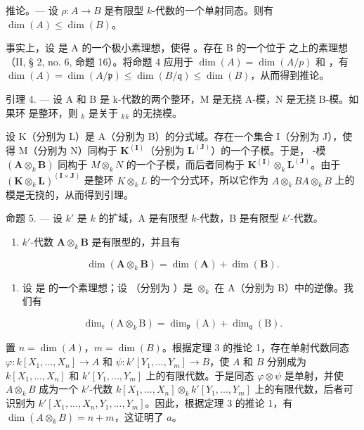 推论。--- 设 \(\rho: A \to B\) 是有限型 \(k\)-代数的一个单射同态。则有 \(\dim(A) \leqslant \dim(B)\)。

事实上，设  是 A 的一个极小素理想，使得  。存在 B 的一个位于  之上的素理想  （II, § 2, no. 6, 命题 16）。将命题 4 应用于 \(\dim(A) = \dim(A/p)\) 和  ，有 \(\dim(A) = \dim(A/\mathfrak{p}) \leqslant \dim(B/\mathfrak{q}) \leqslant \dim(B)\)，从而得到推论。

引理 4. --- 设 A 和 B 是 k-代数的两个整环，M 是无挠 A-模，N 是无挠 B-模。如果环  是整环，则 \(_{k}\) 是关于 \(_{k}\)\(_{k}\) 的无挠模。

设 K（分别为 L）是 A（分别为 B）的分式域。存在一个集合 I（分别为 J），使得 M（分别为 N）同构于 \(\mathbf{K}^{(\mathbf{I})}\)（分别为 \(\mathbf{L}^{(\mathbf{J})}\)）的一个子模。于是， -模 \((\mathbf{A} \otimes_k \mathbf{B})\) 同构于 \(M \otimes_k N\) 的一个子模，而后者同构于 \(\mathbf{K}^{(\mathbf{I})} \otimes_k \mathbf{L}^{(\mathbf{J})}\)。由于 \((\mathbf{K} \otimes_k \mathbf{L})^{(\mathbf{I} \times \mathbf{J})}\) 是整环 \(K \otimes_k L\) 的一个分式环，所以它作为 \(A \otimes_k B\)\(A \otimes_k B\) 上的模是无挠的，从而得到引理。

命题 5. --- 设 \(k'\) 是 \(k\) 的扩域，A 是有限型 \(k\)-代数，B 是有限型 \(k'\)-代数。

\begin{enumerate}
\def\labelenumi{\alph{enumi})}
\tightlist
\item
  \(k'\)-代数 \(\mathbf{A} \otimes_k \mathbf{B}\) 是有限型的，并且有
\end{enumerate}

\[
\dim (\mathbf {A} \otimes_ {k} \mathbf {B}) = \dim (\mathbf {A}) + \dim (\mathbf {B}).
\]

\begin{enumerate}
\def\labelenumi{\alph{enumi})}
\setcounter{enumi}{1}
\tightlist
\item
  设  是  的一个素理想；设  （分别为  ）是 \(\otimes_{k}\) 在 A（分别为 B）中的逆像。我们有
\end{enumerate}

\[
\dim_ {\mathfrak {r}} (\mathrm{A} \otimes_ {k} \mathrm{B}) = \dim_ {\mathfrak {p}} (\mathrm{A}) + \dim_ {\mathfrak {q}} (\mathrm{B}).
\]

置 \(n = \dim(A)\)，\(m = \dim(B)\)。根据定理 3 的推论 1，存在单射代数同态 \(\varphi: k[X_1, ..., X_n] \to A\) 和 \(\psi: k'[Y_1, ..., Y_m] \to B\)，使 \(A\) 和 \(B\) 分别成为 \(k[X_1, ..., X_n]\) 和 \(k'[Y_1, ..., Y_m]\) 上的有限代数。于是同态 \(\varphi \otimes \psi\) 是单射，并使 \(A \otimes_k B\) 成为一个 \(k'\)-代数 \(k[X_1, ..., X_n] \otimes_k k'[Y_1, ..., Y_m]\) 上的有限代数，后者可识别为 \(k'[X_1, ..., X_n, Y_1, ..., Y_m]\)。因此，根据定理 3 的推论 1，有 \(\dim(A \otimes_k B) = n + m\)，这证明了 \(a\)。

